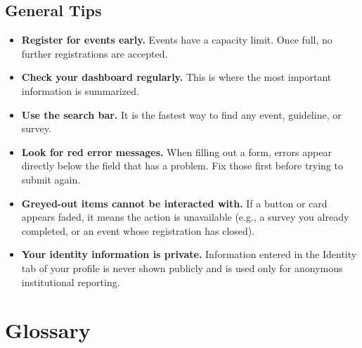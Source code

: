 \documentclass[12pt, a4paper]{article}
\begin{document}
\subsection{General Tips}
\begin{itemize}[leftmargin=1.5em]
  \item \textbf{Register for events early.} Events have a capacity limit. Once full, no further registrations are accepted.
  \item \textbf{Check your dashboard regularly.} This is where the most important information is summarized.
  \item \textbf{Use the search bar.} It is the fastest way to find any event, guideline, or survey.
  \item \textbf{Look for red error messages.} When filling out a form, errors appear directly below the field that has a problem. Fix those first before trying to submit again.
  \item \textbf{Greyed-out items cannot be interacted with.} If a button or card appears faded, it means the action is unavailable (e.g., a survey you already completed, or an event whose registration has closed).
  \item \textbf{Your identity information is private.} Information entered in the Identity tab of your profile is never shown publicly and is used only for anonymous institutional reporting.
\end{itemize}

\newpage
\section{Glossary}
\end{document}
